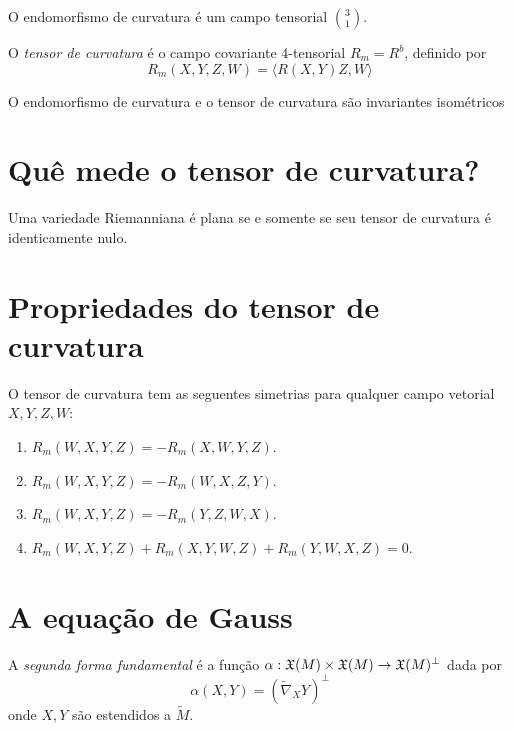 \begin{proposicao}
	O endomorfismo de curvatura é um campo tensorial $\binom{3}{1}$.
\end{proposicao}

\begin{definicao}
	O \emph{tensor de curvatura} é o campo covariante 4-tensorial $R_m = R^b$, definido por
	\begin{equation*}
		R_m (X,Y,Z,W) = \langle R(X,Y)Z,W \rangle
	\end{equation*}
\end{definicao}

\begin{lema}
	O endomorfismo de curvatura e o tensor de curvatura são invariantes isométricos
\end{lema}

\section{Quê mede o tensor de curvatura?}

\begin{teorema}
	Uma variedade Riemanniana é plana se e somente se seu tensor de curvatura é identicamente nulo.
\end{teorema}


\section{Propriedades do tensor de curvatura}

\begin{proposicao}
	O tensor de curvatura tem as seguentes simetrias para qualquer campo vetorial $X,Y,Z,W$:
	\begin{enumerate}
		\item $R_m(W,X,Y,Z) = -R_m(X,W,Y,Z)$.
		\item $R_m(W,X,Y,Z) = -R_m(W,X,Z,Y)$.
		\item $R_m(W,X,Y,Z) = -R_m(Y,Z,W,X)$.
		\item $R_m(W,X,Y,Z) + R_m(X,Y,W,Z) + R_m(Y,W,X,Z) = 0$.
	\end{enumerate}
\end{proposicao}


\section{A equação de Gauss}

\begin{definicao}
	A \emph{segunda forma fundamental} é a função $\alpha: \mathfrak{X}(M) \times \mathfrak{X}(M) \rightarrow \mathfrak{X}(M)^\perp$ dada por
	\begin{equation*}
		\alpha(X,Y) = (\tilde{\nabla}_X Y)^\perp
	\end{equation*} 
	onde $X,Y$ são estendidos a $\tilde{M}$.
\end{definicao}


